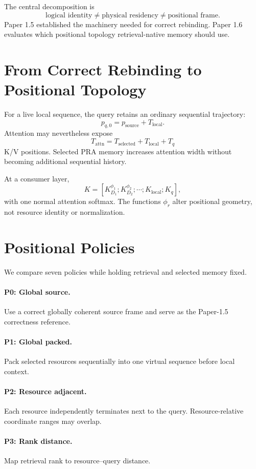\documentclass[10pt]{article}
\begin{document}
The central decomposition is
\[
\boxed{\text{logical identity}}
\neq
\boxed{\text{physical residency}}
\neq
\boxed{\text{positional frame}}.
\]
Paper 1.5 established the machinery needed for correct rebinding. Paper 1.6 evaluates which positional topology retrieval-native memory should use.

\section{From Correct Rebinding to Positional Topology}
For a live local sequence, the query retains an ordinary sequential trajectory:
\[
p_{q,0}=p_{\mathrm{source}}+T_{\mathrm{local}}.
\]
Attention may nevertheless expose
\[
T_{\mathrm{attn}}=T_{\mathrm{selected}}+T_{\mathrm{local}}+T_q
\]
K/V positions. Selected PRA memory increases attention width without becoming additional sequential history.

At a consumer layer,
\[
K=[K_{D_1}^{\phi_1};K_{D_2}^{\phi_2};\cdots;K_{\mathrm{local}};K_q],
\]
with one normal attention softmax. The functions $\phi_r$ alter positional geometry, not resource identity or normalization.

\section{Positional Policies}
We compare seven policies while holding retrieval and selected memory fixed.

\paragraph{P0: Global source.}
Use a correct globally coherent source frame and serve as the Paper-1.5 correctness reference.

\paragraph{P1: Global packed.}
Pack selected resources sequentially into one virtual sequence before local context.

\paragraph{P2: Resource adjacent.}
Each resource independently terminates next to the query. Resource-relative coordinate ranges may overlap.

\paragraph{P3: Rank distance.}
Map retrieval rank to resource--query distance.
\end{document}

